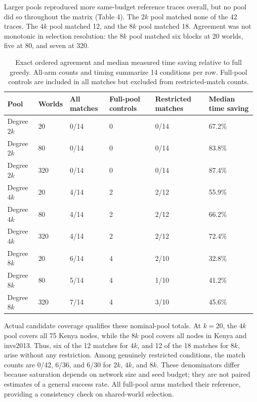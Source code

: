 \documentclass[smallextended]{svjour3}
\begin{document}
Larger pools reproduced more same-budget reference traces overall, but no pool did so throughout the matrix (Table 4). The \(2k\) pool matched none of the 42 traces. The \(4k\) pool matched 12, and the \(8k\) pool matched 18. Agreement was not monotonic in selection resolution: the \(8k\) pool matched six blocks at 20 worlds, five at 80, and seven at 320.

\begin{table}[tbp]
\caption{Exact ordered agreement and median measured time saving relative to full greedy. All-arm counts and timing summarize 14 conditions per row. Full-pool controls are included in all matches but excluded from restricted-match counts.}
\label{tab:4}
\begin{tabularx}{\linewidth}{@{}lYYYYY@{}}
\toprule
\textbf{Pool} & \textbf{Worlds} & \textbf{All matches} & \textbf{Full-pool controls} & \textbf{Restricted matches} & \textbf{Median time saving} \\
\midrule
Degree \(2k\) & 20 & 0/14 & 0 & 0/14 & 67.2\% \\
Degree \(2k\) & 80 & 0/14 & 0 & 0/14 & 83.8\% \\
Degree \(2k\) & 320 & 0/14 & 0 & 0/14 & 87.4\% \\
Degree \(4k\) & 20 & 4/14 & 2 & 2/12 & 55.9\% \\
Degree \(4k\) & 80 & 4/14 & 2 & 2/12 & 66.2\% \\
Degree \(4k\) & 320 & 4/14 & 2 & 2/12 & 72.4\% \\
Degree \(8k\) & 20 & 6/14 & 4 & 2/10 & 32.8\% \\
Degree \(8k\) & 80 & 5/14 & 4 & 1/10 & 41.2\% \\
Degree \(8k\) & 320 & 7/14 & 4 & 3/10 & 45.6\% \\
\bottomrule
\end{tabularx}
\end{table}

Actual candidate coverage qualifies these nominal-pool totals. At \(k=20\), the \(4k\) pool covers all 75 Kenya nodes, while the \(8k\) pool covers all nodes in Kenya and invs2013. Thus, six of the 12 matches for \(4k\), and 12 of the 18 matches for \(8k\), arise without any restriction. Among genuinely restricted conditions, the match counts are 0/42, 6/36, and 6/30 for \(2k\), \(4k\), and \(8k\). These denominators differ because saturation depends on network size and seed budget; they are not paired estimates of a general success rate. All full-pool arms matched their reference, providing a consistency check on shared-world selection.
\end{document}
